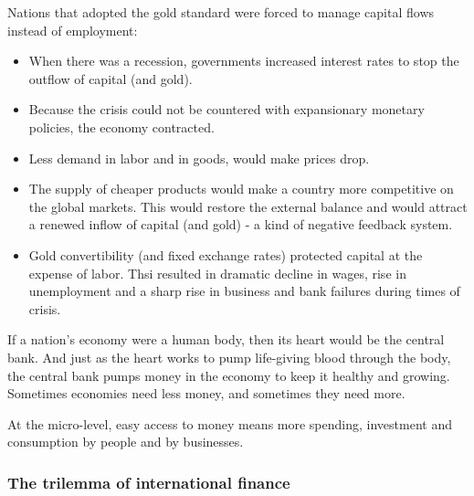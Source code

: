 Nations that adopted the gold standard were forced to manage capital flows
instead of employment:
\begin{itemize}
    \item When there was a recession, governments increased interest rates
        to stop the outflow of capital (and gold).
    \item Because the crisis could not be countered with expansionary
        monetary policies, the economy contracted.
    \item Less demand in labor and in goods, would make prices drop.
    \item The supply of cheaper products would make a country more
        competitive on the global markets. This would restore the external
        balance and would attract a renewed inflow of capital (and gold)
        - a kind of negative feedback system.
    \item Gold convertibility (and fixed exchange rates) protected capital
        at the expense of labor. Thsi resulted in dramatic decline in wages,
        rise in unemployment and a sharp rise in business and bank failures
        during times of crisis.
\end{itemize}

If a nation's economy were a human body, then its heart would be the central
bank. And just as the heart works to pump life-giving blood through the
body, the central bank pumps money in the economy to keep it healthy and
growing. Sometimes economies need less money, and sometimes they need more.

At the micro-level, easy access to money means more spending, investment and
consumption by people and by businesses.

\pagebreak

\subsubsection{The trilemma of international finance}

